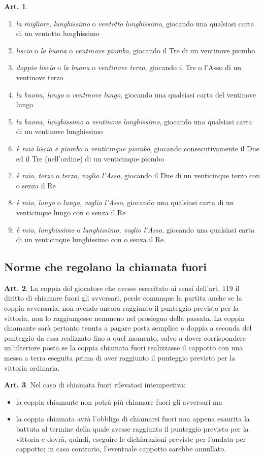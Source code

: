 \documentclass[italian,a4paper]{article}
\theoremstyle{definition}
\newtheorem{art}{Art.}
\begin{document}
\begin{art}
\begin{enumerate}
\item \emph{la migliore, lunghissimo} o \emph{ventotto lunghissimo},  giocando una qualsiasi carta di un ventotto lunghissimo
\item \emph{liscio} o \emph{la buona} o \emph{ventinove piombo},  giocando il Tre di un ventinove piombo
\item \emph{doppio liscio} o \emph{la buona} o \emph{ventinove terzo},  giocando il Tre o l'Asso di un ventinove terzo
\item \emph{la buona, lungo} o \emph{ventinove lungo},  giocando una qualsiasi carta del ventinove lungo
\item \emph{la buona, lunghissimo} o \emph{ventinove lunghissimo},  giocando una qualsiasi carta di un ventinove lunghissimo
\item \emph{è mio liscio e piombo} o \emph{venticinque piombo},  giocando consecutivamente il Due ed il Tre (nell'ordine) di un venticinque piombo
\item \emph{è mio, terzo} o \emph{terzo, voglio l'Asso},  giocando il Due di un venticinque terzo con o senza il Re
\item \emph{è mio, lungo} o \emph{lungo, voglio l'Asso},  giocando una qualsiasi carta di un venticinque lungo con o senza il Re
\item \emph{è mio, lunghissimo} o \emph{lunghissimo, voglio l'Asso},  giocando una qualsiasi carta di un venticinque lunghissimo con o senza il Re.
\end{enumerate}
\end{art}
\subsection{Norme che regolano la chiamata fuori}
\begin{art}
La coppia del giocatore che avesse esercitato ai sensi dell'art. 119 il diritto di chiamare fuori gli avversari, perde comunque la partita anche se la coppia avversaria, non avendo ancora raggiunto il punteggio previsto per la vittoria, non lo raggiungesse nemmeno nel prosieguo della passata.
La coppia chiamante sarà pertanto tenuta a pagare posta semplice o doppia a seconda del punteggio da essa realizzato fino a quel momento, salvo a dover corrispondere un'ulteriore posta se la coppia chiamata fuori realizzasse il cappotto con una messa a terra eseguita prima di aver raggiunto il punteggio previsto per la vittoria ordinaria.
\end{art}
\begin{art}
Nel caso di chiamata fuori rilevatasi intempestiva:
\begin{itemize}
\item    la coppia chiamante non potrà più chiamare fuori gli avversari ma
\item    la coppia chiamata avrà l'obbligo di chiamarsi fuori non appena esaurita la battuta al termine della quale avesse raggiunto il punteggio previsto per la vittoria e dovrà, quindi, eseguire le  dichiarazioni  previste per l'andata per cappotto; in caso contrario, l'eventuale cappotto sarebbe annullato.
    \end{itemize}
\end{art}
\end{document}
